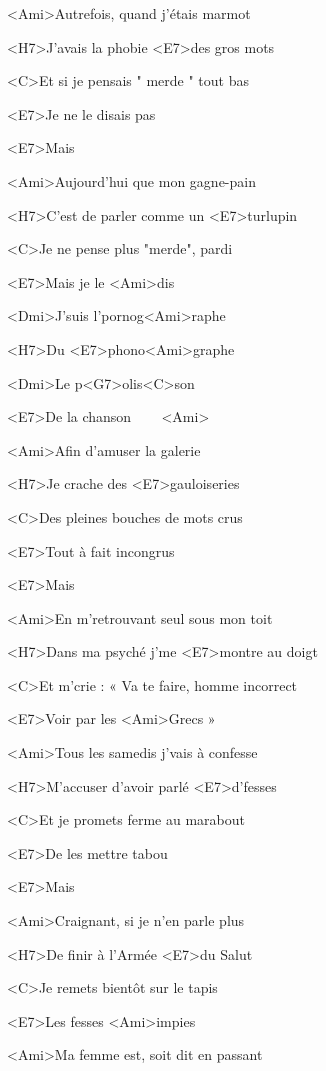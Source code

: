 

\zs
<Ami>Autrefois, quand j'étais marmot

<H7>J'avais la phobie <E7>des gros mots

<C>Et si je pensais " merde " tout bas

<E7>Je ne le disais pas

<E7>Mais

<Ami>Aujourd'hui que mon gagne-pain

<H7>C'est de parler comme un <E7>turlupin

<C>Je ne pense plus "merde", pardi

<E7>Mais je le <Ami>dis
\ks

\zr
<Dmi>J'suis l'pornog<Ami>raphe

<H7>Du <E7>phono<Ami>graphe

<Dmi>Le p<G7>olis<C>son

<E7>De la chanson ~~~ <Ami>
\kr

\zs
<Ami>Afin d'amuser la galerie

<H7>Je crache des <E7>gauloiseries

<C>Des pleines bouches de mots crus

<E7>Tout à fait incongrus

<E7>Mais

<Ami>En m'retrouvant seul sous mon toit

<H7>Dans ma psyché j'me <E7>montre au doigt

<C>Et m'crie : « Va te faire, homme incorrect

<E7>Voir par les <Ami>Grecs »
\ks

\zr\kr

\zs
<Ami>Tous les samedis j'vais à confesse

<H7>M'accuser d'avoir parlé <E7>d'fesses

<C>Et je promets ferme au marabout

<E7>De les mettre tabou

<E7>Mais

<Ami>Craignant, si je n'en parle plus

<H7>De finir à l'Armée <E7>du Salut

<C>Je remets bientôt sur le tapis

<E7>Les fesses <Ami>impies
\ks

\zr\kr

\zs
<Ami>Ma femme est, soit dit en passant


